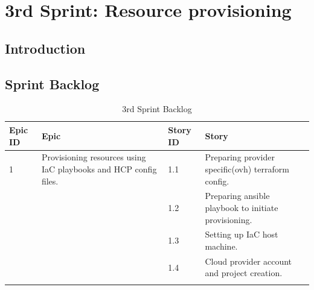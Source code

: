 \graphicspath{{./assets/}}
\setcounter{mtc}{5}
\chapter{3rd Sprint: Resource provisioning  }

\minitoc
\newpage
\section*{Introduction}

\section{Sprint Backlog}

\begin{longtable}[H]{|m{1.5cm}|m{3cm}|m{1.5cm}|m{8cm}|}
\hline
{\textbf{Epic ID}} & {\textbf{Epic}} & {\textbf{Story ID}} & {\textbf{Story}}\\
\hline
1  & \raggedright Provisioning resources using IaC playbooks and HCP config files.  &  1.1	 & Preparing provider specific(ovh) terraform config. \\
\cline{3-4}
& & 1.2 & Preparing ansible playbook to initiate provisioning. \\
\cline{3-4}
& & 1.3	& Setting up IaC host machine.  \\
\cline{3-4}
& & 1.4	& Cloud provider account and project creation.  \\
\hline
\caption{3rd Sprint Backlog}
\end{longtable}

